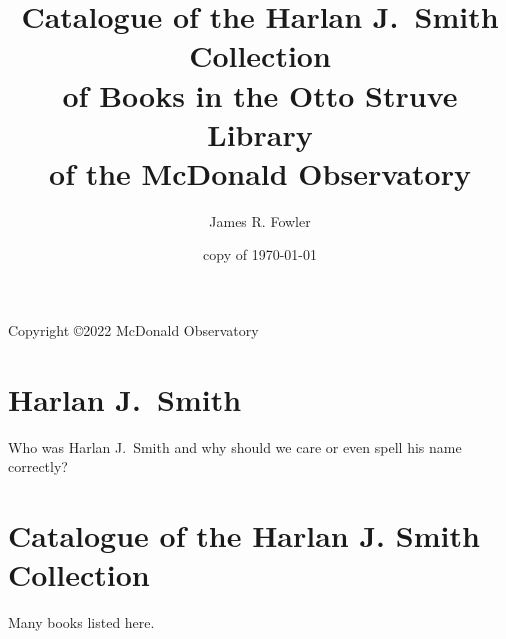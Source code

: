 \documentclass{article}%
\begin{document}
\title{Catalogue of the Harlan J.~Smith Collection \\
  of Books in the Otto Struve Library \\
  of the McDonald Observatory}
\author{James R. Fowler}
\date{copy of \today}
\maketitle

\vspace*{5 in}
\centerline{Copyright \copyright 2022 McDonald Observatory}

\section*{Harlan J.~Smith}

Who was Harlan J.~Smith and why should we care or even
spell his name correctly?

\section*{Catalogue of the Harlan J. Smith Collection}

Many books listed here.
\end{document}
